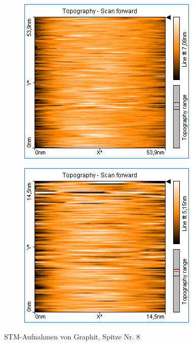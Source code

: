 \begin{figure}
    \begin{subfigure}[b]{\picwidth}
        \includegraphics[width=\textwidth]{data/Graphit/pic_03_01_50nm}
        \caption{}
        \label{fig:graphit_03_01}
    \end{subfigure}\qquad
    \begin{subfigure}[b]{\picwidth}
        \includegraphics[width=\textwidth]{data/Graphit/pic_03_02_15nm}
        \caption{}
        \label{fig:graphit_03_02}
    \end{subfigure}
    \caption{STM-Aufnahmen von Graphit, Spitze Nr. 8}\label{fig:graphit_03}
\end{figure}


